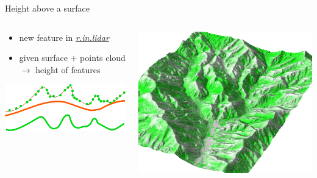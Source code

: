 \documentclass[xcolor={dvipsnames,usenames},beamer,aspectratio=169]{beamer}
\newcommand{\gmodule}[1]{\href{http://grass.osgeo.org/grass71/manuals/#1.html}{\emph{#1}}}
\begin{document}
\begin{frame}{Height above a surface}

\begin{columns}
\begin{column}{0.4\textwidth}

\begin{itemize}
  \item new feature in \gmodule{r.in.lidar}
  \item given surface $+$ points cloud\\
    $\longrightarrow$ height of features
\end{itemize}

\begin{center}
\includegraphics[width=\textwidth]{images/features/base_raster}
\end{center}

\end{column}
\begin{column}{0.55\textwidth}

\begin{center}
  \includegraphics[width=\textwidth]{grass/max_height_10m_on_ground_from_neighbors_smaller_area_top}
\end{center}

\end{column}
\end{columns}

\end{frame}
\end{document}
